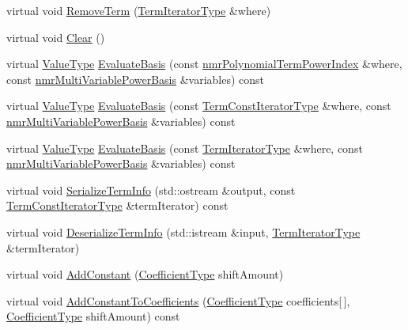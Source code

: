 \begin{DoxyCompactItemize}
\item 
virtual void \hyperlink{classnmr_standard_polynomial_a0149f843c87d2082933b4d317f9ca69d}{Remove\-Term} (\hyperlink{classnmr_polynomial_container_a276e57445d038e8a16462f47b85719a3}{Term\-Iterator\-Type} \&where)
\item 
virtual void \hyperlink{classnmr_standard_polynomial_a7efcdc4097121d65de20dde2523e6525}{Clear} ()
\item 
virtual \hyperlink{classnmr_polynomial_base_a72f0bc16b225e4708bcf15a77ba206e3}{Value\-Type} \hyperlink{classnmr_standard_polynomial_adbcaa19b3060f8495fb5f9f73cca5018}{Evaluate\-Basis} (const \hyperlink{classnmr_polynomial_term_power_index}{nmr\-Polynomial\-Term\-Power\-Index} \&where, const \hyperlink{classnmr_multi_variable_power_basis}{nmr\-Multi\-Variable\-Power\-Basis} \&variables) const 
\item 
virtual \hyperlink{classnmr_polynomial_base_a72f0bc16b225e4708bcf15a77ba206e3}{Value\-Type} \hyperlink{classnmr_standard_polynomial_a28025454a47d7cc8d412e44ac0d32f8b}{Evaluate\-Basis} (const \hyperlink{classnmr_polynomial_container_aba8d31506ab6a487fdc4fe2815469442}{Term\-Const\-Iterator\-Type} \&where, const \hyperlink{classnmr_multi_variable_power_basis}{nmr\-Multi\-Variable\-Power\-Basis} \&variables) const 
\item 
virtual \hyperlink{classnmr_polynomial_base_a72f0bc16b225e4708bcf15a77ba206e3}{Value\-Type} \hyperlink{classnmr_standard_polynomial_a929583fdcc7461fef1086cab401a698d}{Evaluate\-Basis} (const \hyperlink{classnmr_polynomial_container_a276e57445d038e8a16462f47b85719a3}{Term\-Iterator\-Type} \&where, const \hyperlink{classnmr_multi_variable_power_basis}{nmr\-Multi\-Variable\-Power\-Basis} \&variables) const 
\item 
virtual void \hyperlink{classnmr_standard_polynomial_a5867b0d1cba13066228b8a8862feebfa}{Serialize\-Term\-Info} (std\-::ostream \&output, const \hyperlink{classnmr_polynomial_container_aba8d31506ab6a487fdc4fe2815469442}{Term\-Const\-Iterator\-Type} \&term\-Iterator) const 
\item 
virtual void \hyperlink{classnmr_standard_polynomial_ac4e1ca13a07cf587db161710a09f5fcb}{Deserialize\-Term\-Info} (std\-::istream \&input, \hyperlink{classnmr_polynomial_container_a276e57445d038e8a16462f47b85719a3}{Term\-Iterator\-Type} \&term\-Iterator)
\item 
virtual void \hyperlink{classnmr_standard_polynomial_adc5e1beae5c00ee4dcf3582a10c99ba5}{Add\-Constant} (\hyperlink{classnmr_polynomial_base_a8693efdfc8585ccb49abea69f74f3eef}{Coefficient\-Type} shift\-Amount)
\item 
virtual void \hyperlink{classnmr_standard_polynomial_a8b1737695f4eb49a0876fda6cb909795}{Add\-Constant\-To\-Coefficients} (\hyperlink{classnmr_polynomial_base_a8693efdfc8585ccb49abea69f74f3eef}{Coefficient\-Type} coefficients\mbox{[}$\,$\mbox{]}, \hyperlink{classnmr_polynomial_base_a8693efdfc8585ccb49abea69f74f3eef}{Coefficient\-Type} shift\-Amount) const 
\end{DoxyCompactItemize}
